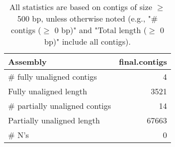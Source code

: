 \documentclass[12pt,a4paper]{article}
\begin{document}
\begin{table}[ht]
\begin{center}
\caption{All statistics are based on contigs of size $\geq$ 500 bp, unless otherwise noted (e.g., "\# contigs ($\geq$ 0 bp)" and "Total length ($\geq$ 0 bp)" include all contigs).}
\begin{tabular}{|l*{1}{|r}|}
\hline
Assembly & final.contigs \\ \hline
\# fully unaligned contigs & 4 \\ \hline
Fully unaligned length & 3521 \\ \hline
\# partially unaligned contigs & 14 \\ \hline
Partially unaligned length & 67663 \\ \hline
\# N's & 0 \\ \hline
\end{tabular}
\end{center}
\end{table}
\end{document}
